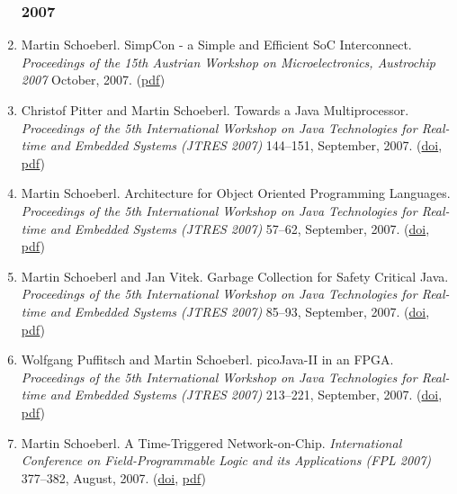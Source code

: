 \begin{enumerate}
\subsubsection*{2007}

\item Martin Schoeberl.
 SimpCon - a Simple and Efficient SoC Interconnect.
 \emph{Proceedings of the 15th Austrian Workshop on Microelectronics, Austrochip 2007} October, 2007.
(\href{http://www.jopdesign.com/doc/simpcon_austrochip2007.pdf}{pdf})

\item Christof Pitter and Martin Schoeberl.
 Towards a Java Multiprocessor.
 \emph{Proceedings of the 5th International Workshop on Java Technologies for Real-time and Embedded Systems (JTRES 2007)} 144--151, September, 2007.
(\href{http://dx.doi.org/http://doi.acm.org/10.1145/1288940.1288962}{doi}, \href{http://www.jopdesign.com/doc/jopcmp.pdf}{pdf})

\item Martin Schoeberl.
 Architecture for Object Oriented Programming Languages.
 \emph{Proceedings of the 5th International Workshop on Java Technologies for Real-time and Embedded Systems (JTRES 2007)} 57--62, September, 2007.
(\href{http://dx.doi.org/10.1145/1288940.1288949}{doi}, \href{http://www.jopdesign.com/doc/oohw.pdf}{pdf})

\item Martin Schoeberl and Jan Vitek.
 Garbage Collection for Safety Critical Java.
 \emph{Proceedings of the 5th International Workshop on Java Technologies for Real-time and Embedded Systems (JTRES 2007)} 85--93, September, 2007.
(\href{http://dx.doi.org/10.1145/1288940.1288953}{doi}, \href{http://www.jopdesign.com/doc/scjgc.pdf}{pdf})

\item Wolfgang Puffitsch and Martin Schoeberl.
 picoJava-II in an FPGA.
 \emph{Proceedings of the 5th International Workshop on Java Technologies for Real-time and Embedded Systems (JTRES 2007)} 213--221, September, 2007.
(\href{http://dx.doi.org/http://doi.acm.org/10.1145/1288940.1288972}{doi}, \href{http://www.jopdesign.com/doc/pjfpga.pdf}{pdf})

\item Martin Schoeberl.
 A Time-Triggered Network-on-Chip.
 \emph{International Conference on Field-Programmable Logic and its Applications (FPL 2007)} 377--382, August, 2007.
(\href{http://dx.doi.org/10.1109/FPL.2007.4380675}{doi}, \href{http://www.jopdesign.com/doc/ttnoc_fpl2007.pdf}{pdf})


\end{enumerate}
